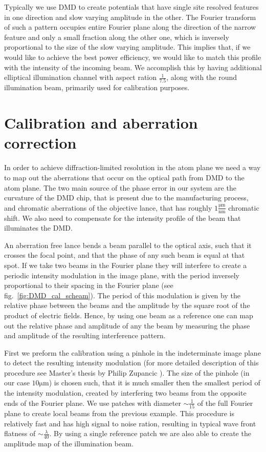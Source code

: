 Typically we use DMD to create potentials that have single site resolved features in one direction and slow varying amplitude in the other. The Fourier transform of such a pattern occupies entire Fourier plane along the direction of the narrow feature and only a small fraction along the other one, which is inversely proportional to the size of the slow varying amplitude. This implies that, if we would like to achieve the best power efficiency, we would like to match this profile with the intensity of the incoming beam. We accomplish this by having additional elliptical illumination channel with aspect ration $\frac{1}{7.5}$, along with the round illumination beam, primarily used for calibration purposes.

\section{Calibration and aberration correction}
In order to achieve diffraction-limited resolution in the atom plane we need a way to map out the aberrations that occur on the optical path from DMD to the atom plane. The two main source of the phase error in our system are the curvature of the DMD chip, that is present due to the manufacturing process, and chromatic aberrations of the objective lance, that has roughly $1 \frac{\mathrm{\mu m}}{\mathrm{nm}} $ chromatic shift. We also need to compensate for the intensity profile of the beam that illuminates the DMD.

An aberration free lance bends a beam parallel to the optical axis, such that it crosses the focal point, and that the phase of any such beam is equal at that spot. If we take two beams in the Fourier plane they will interfere to create a periodic intensity modulation in the image plane, with the period inversely proportional to their spacing in the Fourier plane (see fig.~\ref{fig:DMD_cal_scheam}). The period of this modulation is given by the relative phase between the beams and the amplitude by the square root of the product of electric fields. Hence, by using one beam as a reference one can map out the relative phase and amplitude of any the beam by measuring the phase and amplitude of the resulting interference pattern.

First we preform the calibration using a pinhole in the indeterminate image plane to detect the resulting intensity modulation (for more detailed description of this procedure see Master’s thesis by Philip Zupancic \cite{Zupancic thesis}). The size of the pinhole (in our case $10 \mathrm{\mu m}$) is chosen such, that it is much smaller then the smallest period of the intensity modulation, created by interfering two beams from the opposite ends of the Fourier plane. We use patches with diameter $\sim \frac{1}{15}$ of the full Fourier plane to create local beams from the previous example. This procedure is relatively fast and has high signal to noise ration, resulting in typical wave front flatness of $\sim \frac{\lambda}{40}$. By using a single reference patch we are also able to create the amplitude map of the illumination beam.  

